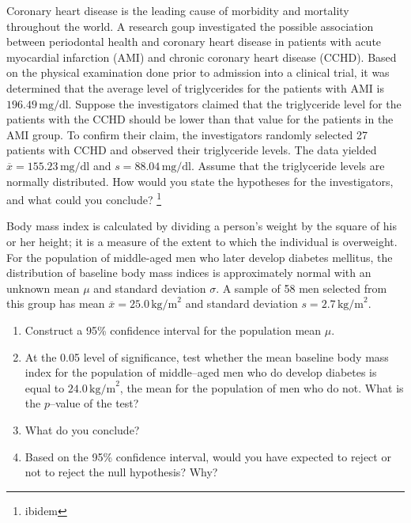 \begin{problem}  %
  Coronary heart disease is the leading cause of morbidity and
  mortality throughout the world. A research goup  investigated the
  possible association between periodontal health and coronary heart
  disease in patients with acute myocardial infarction (AMI) and
  chronic coronary heart disease (CCHD). Based on the physical
  examination done prior to admission into a clinical trial, it was
  determined that the average level of triglycerides for the patients
  with AMI is $196.49
\,\textrm{mg/dl}$. Suppose the investigators claimed that the
triglyceride level for the patients with the CCHD should be lower than
that value for the patients in the AMI group. To confirm their claim, the investigators randomly selected 27 patients with CCHD and observed their triglyceride levels. The data
yielded $\overline{x}= 155.23\,\textrm{mg/dl}$ and $s = 88.04\,\textrm{mg/dl}$. Assume that the triglyceride levels are normally distributed. How would you state the hypotheses for the investigators, and what could you conclude? \footnote{ibidem}
\end{problem}

\begin{problem} 
  Body mass index is calculated by dividing a person's weight by the square of his or her height; it is a measure of the extent to which the individual is overweight. For the population of middle-aged men who later develop diabetes mellitus, the distribution of baseline body mass indices is approximately normal with an unknown mean $\mu$ and standard deviation $\sigma$. A sample of 58 men selected from this group has mean $\overline{x}=25.0\,\textrm{kg/m}^2$ and standard deviation $s=2.7\,\textrm{kg/m}^2$.
  \begin{enumerate}
  \item Construct a 95\% confidence interval for the population mean $\mu$.
  \item At the 0.05 level of significance, test whether the mean baseline body mass index for the population of middle--aged men who do develop diabetes is equal to $24.0\,\textrm{kg/m}^2$, the mean for the population of men who do not. What is the $p$--value of the test?
  \item What do you conclude?
  \item Based on the 95\% confidence interval, would you have expected to reject or not to reject the null hypothesis? Why?
\end{enumerate}
\end{problem}

